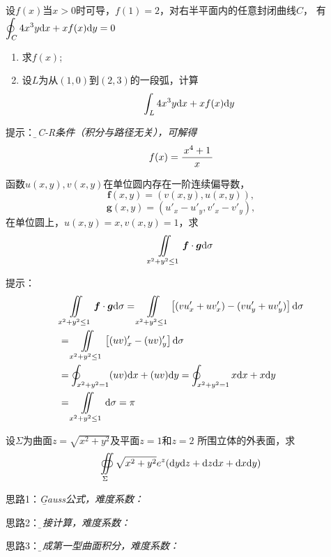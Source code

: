 \begin{frame}
	\linespread{1.2}
	设$f(x)$当$x>0$时可导，$f(1)=2$，对右半平面内的任意封闭曲线$C$，
	有$\displaystyle\oint_C4x^3y\mathrm{d} x+xf(x)\mathrm{d} y=0$
	\begin{enumerate}[(1)]
	  \item 求$f(x)$;
	  \item 设$L$为从$(1,0)$到$(2,3)$的一段弧，计算
	  $$\displaystyle\int_L4x^3y\mathrm{d} x+xf(x)\mathrm{d} y$$
	\end{enumerate}
		
	\bigskip\pause
	\alert{提示：}{\it\b 
	由C-R条件（积分与路径无关），可解得$$f(x)=\displaystyle\frac{\,{x^4+1}\,}{\,{x}\,}$$}
\end{frame}

\begin{frame}
	\linespread{1.2}
	函数$u(x,y),v(x,y)$在单位圆内存在一阶连续偏导数，
	$$\bm{f}(x,y)=(v(x,y),u(x,y)),$$
	$$\bm{g}(x,y)=\left(u'_x-u'_y,v'_x-v'_y\right),$$
	在单位圆上，$u(x,y)=x,v(x,y)=1$，求
	$$\iint\limits_{x^2+y^2\leq 1}\bm{f}\cdot\bm{g}\mathrm{d}\sigma$$
		
\end{frame}

\begin{frame}
	\linespread{1.2}
		
	\alert{提示：}
	{\it\b
	\begin{align}
		&\iint\limits_{x^2+y^2\leq 1}\bm{f}\cdot\bm{g}\mathrm{d}\sigma\notag
	    =\iint\limits_{x^2+y^2\leq 1}\left[(vu'_x+uv'_x)-
		(vu'_y+uv'_y)\right]\mathrm{d}\sigma\notag\\
		&=\iint\limits_{x^2+y^2\leq 1}\left[(uv)'_x-(uv)'_y\right]
		\mathrm{d}\sigma\notag\\
		&=\oint_{x^2+y^2=1}(uv)\mathrm{d} x+(uv)\mathrm{d} y
		=\oint_{x^2+y^2=1}x\mathrm{d} x+x\mathrm{d} y\notag\\
		&=\iint\limits_{x^2+y^2\leq 1}\mathrm{d}\sigma=\pi\notag
	\end{align}
	}
\end{frame}

\begin{frame}
	\linespread{1.2}
	设$\Sigma$为曲面$z=\sqrt{x^2+y^2}$及平面$z=1$和$z=2$
	所围立体的外表面，求
	$$\oiint\limits_{\Sigma}\sqrt{x^2+y^2}e^z(\mathrm{d} y\mathrm{d} z+\mathrm{d} z\mathrm{d} x+\mathrm{d} x\mathrm{d} y)$$
		
	\bigskip\pause	
	\alert{思路1：}{\it\b Gauss公式，难度系数：
	\FiveStar\FiveStar\FiveStar\FiveStar\FiveStar\pause}
	
	\alert{思路2：}{\it\b 直接计算，难度系数：
	\FiveStar\FiveStar\FiveStar\FiveStarOpen\FiveStarOpen\pause}
	
	\alert{思路3：}{\it\b 化成第一型曲面积分，难度系数：
	\FiveStar\FiveStar\FiveStar\FiveStar\FiveStarOpen}
\end{frame}

